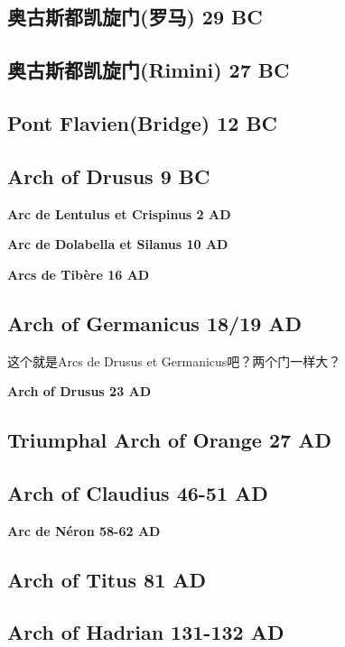 \documentclass[a4paper,dvipdfm]{article}
\begin{document}
\subsection{奥古斯都凯旋门(罗马) 29 BC}

\subsection{奥古斯都凯旋门(Rimini) 27 BC}

\subsection{Pont Flavien(Bridge) 12 BC}
\label{sec:pont-flav-12}

\subsection{Arch of Drusus 9 BC}
\label{sec:arch-drusus-9}

\textbf{Arc de Lentulus et Crispinus 2 AD}

\textbf{Arc de Dolabella et Silanus 10 AD}

\textbf{Arcs de Tibère 16 AD}

\subsection{Arch of Germanicus 18/19 AD}
\label{sec:arch-germanicus-1819}

这个就是Arcs de Drusus et Germanicus吧？两个门一样大？

\textbf{Arch of Drusus 23 AD}

\subsection{Triumphal Arch of Orange 27 AD}
\label{sec:triumph-arch-orange}

\subsection{Arch of Claudius 46-51 AD}

\textbf{Arc de Néron 58-62 AD}

\subsection{Arch of Titus 81 AD}

\subsection{Arch of Hadrian 131-132 AD}
\label{sec:arch-hadrian-131}
\end{document}
